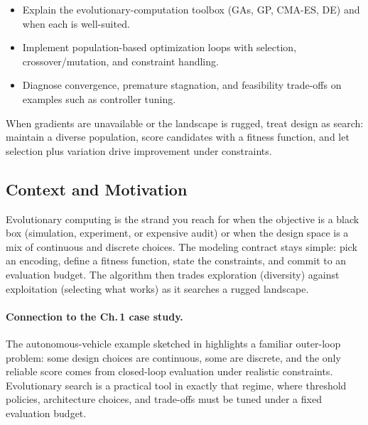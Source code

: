 \begin{tcolorbox}[summarybox, title={Learning Outcomes}]
\begin{itemize}
    \item Explain the evolutionary-computation toolbox (GAs, GP, CMA-ES, DE) and when each is well-suited.
    \item Implement population-based optimization loops with selection, crossover/mutation, and constraint handling.
    \item Diagnose convergence, premature stagnation, and feasibility trade-offs on examples such as controller tuning.
\end{itemize}
\end{tcolorbox}

\begin{tcolorbox}[summarybox, title={Design motif}]
When gradients are unavailable or the landscape is rugged, treat design as search: maintain a diverse population, score candidates with a fitness function, and let selection plus variation drive improvement under constraints.
\end{tcolorbox}

\subsection{Context and Motivation}
\label{sec:evo_context_and_motivation}

Evolutionary computing is the strand you reach for when the objective is a black box (simulation, experiment, or expensive audit) or when the design space is a mix of continuous and discrete choices. The modeling contract stays simple: pick an encoding, define a fitness function, state the constraints, and commit to an evaluation budget. The algorithm then trades exploration (diversity) against exploitation (selecting what works) as it searches a rugged landscape.

\paragraph{Connection to the Ch.\,1 case study.}
The autonomous-vehicle example sketched in  highlights a familiar outer-loop problem: some design choices are continuous, some are discrete, and the only reliable score comes from closed-loop evaluation under realistic constraints. Evolutionary search is a practical tool in exactly that regime, where threshold policies, architecture choices, and trade-offs must be tuned under a fixed evaluation budget.

